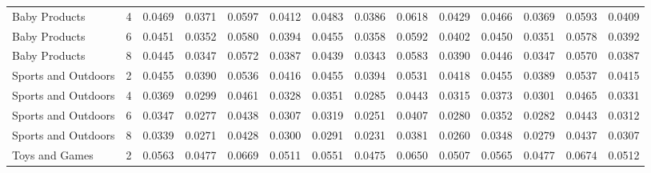 \documentclass[11pt]{article}
\begin{document}
\begin{table}[!t]
{\begin{tabular}{lccccc|cccc|cccc}
Baby Products & 4 & 0.0469 & 0.0371 & 0.0597 & 0.0412 & 0.0483 & 0.0386 & 0.0618 & 0.0429 & 0.0466 & 0.0369 & 0.0593 & 0.0409\\
Baby Products & 6 & 0.0451 & 0.0352 & 0.0580 & 0.0394 & 0.0455 & 0.0358 & 0.0592 & 0.0402 & 0.0450 & 0.0351 & 0.0578 & 0.0392\\
Baby Products & 8 & 0.0445 & 0.0347 & 0.0572 & 0.0387 & 0.0439 & 0.0343 & 0.0583 & 0.0390 & 0.0446 & 0.0347 & 0.0570 & 0.0387\\
\midrule
Sports and Outdoors & 2 & 0.0455 & 0.0390 & 0.0536 & 0.0416 & 0.0455 & 0.0394 & 0.0531 & 0.0418 & 0.0455 & 0.0389 & 0.0537 & 0.0415\\
Sports and Outdoors & 4 & 0.0369 & 0.0299 & 0.0461 & 0.0328 & 0.0351 & 0.0285 & 0.0443 & 0.0315 & 0.0373 & 0.0301 & 0.0465 & 0.0331\\
Sports and Outdoors & 6 & 0.0347 & 0.0277 & 0.0438 & 0.0307 & 0.0319 & 0.0251 & 0.0407 & 0.0280 & 0.0352 & 0.0282 & 0.0443 & 0.0312\\
Sports and Outdoors & 8 & 0.0339 & 0.0271 & 0.0428 & 0.0300 & 0.0291 & 0.0231 & 0.0381 & 0.0260 & 0.0348 & 0.0279 & 0.0437 & 0.0307\\
\midrule
Toys and Games & 2 & 0.0563 & 0.0477 & 0.0669 & 0.0511 & 0.0551 & 0.0475 & 0.0650 & 0.0507 & 0.0565 & 0.0477 & 0.0674 & 0.0512\\

\end{tabular}}
\end{table}
\end{document}

